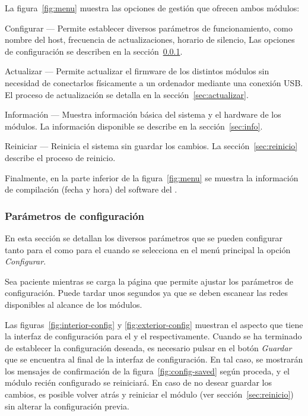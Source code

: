 La figura~\ref{fig:menu} muestra las opciones de gestión que ofrecen ambos módulos:

\begin{descriptioncompact}

\item[Configurar] --- Permite establecer diversos parámetros de funcionamiento, como nombre del host, frecuencia de actualizaciones, horario de silencio, \etc Las opciones de configuración se describen en la sección~\ref{sec:config}.

\item[Actualizar] --- Permite actualizar el firmware de los distintos módulos sin necesidad de conectarlos físicamente a un ordenador mediante una conexión USB. El proceso de actualización se detalla en la sección~\ref{sec:actualizar}.

\item[Información] --- Muestra información básica del sistema y el hardware de los módulos. La información disponible se describe en la sección~\ref{sec:info}.

\item[Reiniciar] --- Reinicia el sistema sin guardar los cambios. La sección~\ref{sec:reinicio} describe el proceso de reinicio.

\end{descriptioncompact}

Finalmente, en la parte inferior de la figura~\ref{fig:menu} se muestra la información de compilación (fecha y hora) del software del \CMS.

\subsubsection{Parámetros de configuración}
\label{sec:config}

En esta sección se detallan los diversos parámetros que se pueden configurar tanto para el \MIE como para el \MEE cuando se selecciona en el menú principal la opción \emph{Configurar}.

Sea paciente mientras se carga la página que permite ajustar los parámetros de configuración. Puede tardar unos segundos ya que se deben escanear las redes disponibles al alcance de los módulos.
\importantend

Las figuras~\ref{fig:interior-config} y \ref{fig:exterior-config} muestran el aspecto que tiene la interfaz de configuración para el \MI y el \ME respectivamente. Cuando se ha terminado de establecer la configuración deseada, es necesario pulsar en el botón \emph{Guardar} que se encuentra al final de la interfaz de configuración. En tal caso, se mostrarán los mensajes de confirmación de la figura~\ref{fig:config-saved} según proceda, y el módulo recién configurado se reiniciará. En caso de no desear guardar los cambios, es posible volver atrás y reiniciar el módulo (ver sección~\ref{sec:reinicio}) sin alterar la configuración previa.

